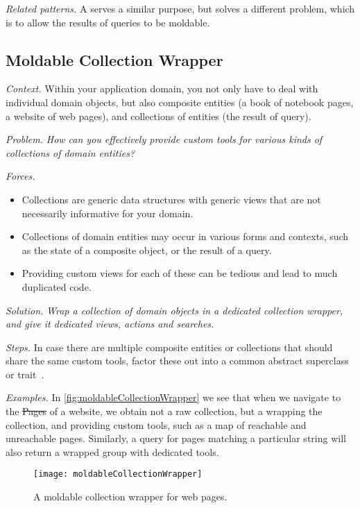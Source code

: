 \documentclass[acmsmall,screen,authorversion,nonacm]{acmart} %
\newcommand{\pattern}[2]{\needlines{10}
\subsection*{#1}\label{pat:#2}}
\newcommand{\patref}[1]{\emph{\nameref{pat:#1}}\xspace}
\newcommand{\patsec}[1]{\noindent\textit{#1.}\xspace}
\begin{document}
\patsec{Related patterns}
A \patref{CollectionWrapper} serves a similar purpose, but solves a different problem, which is to allow the results of queries to be moldable.

\pattern{Moldable Collection Wrapper}{CollectionWrapper}

\patsec{Context}
Within your application domain, you not only have to deal with individual domain objects, but also composite entities (\eg a book of notebook pages, a website of web pages), and collections of entities (\eg the result of query).

\patsec{Problem}
\emph{How can you effectively provide custom tools for various kinds of collections of domain entities?}

\patsec{Forces}
\begin{itemize}[---]
\item Collections are generic data structures with generic views that are not necessarily informative for your domain.
\item Collections of domain entities may occur in various forms and contexts, such as the state of a composite object, or the result of a query.
\item Providing custom views for each of these can be tedious and lead to much duplicated code.
\end{itemize}

\patsec{Solution}
\emph{Wrap a collection of domain objects in a dedicated collection wrapper, and give it dedicated views, actions and searches.}

\patsec{Steps}
In case there are multiple composite entities or collections that should share the same custom tools, factor these out into a common abstract superclass or trait~\cite{Duca06b}.

\patsec{Examples}
In \autoref{fig:moldableCollectionWrapper} we see that when we navigate to the \st{Pages} of a website, we obtain not a raw collection, but a  wrapping the collection, and providing custom tools, such as a map of reachable and unreachable pages.
Similarly, a query for pages matching a particular string will also return a wrapped group with dedicated tools.

\begin{figure}[h]
  \texttt{[image: moldableCollectionWrapper]}
  \caption{A moldable collection wrapper for web pages.}
  \label{fig:moldableCollectionWrapper}
\end{figure}
\end{document}
